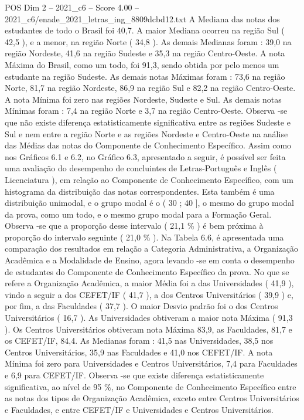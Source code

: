 \begin{textsample}{POS Dim 2 – 2021\_c6 – Score 4.00 – 2021\_c6/enade\_2021\_letras\_ing\_8809dcbd12.txt}
A Mediana das notas dos estudantes de todo o Brasil foi 40,7.
A maior Mediana ocorreu na região Sul ( 42,5 ), e a menor, na região Norte ( 34,8 ).
As demais Medianas foram : 39,0 na região Nordeste, 41,6 na região Sudeste e 35,3 na região Centro-Oeste.
A nota Máxima do Brasil, como um todo, foi 91,3, sendo obtida por pelo menos um estudante na região Sudeste.
As demais notas Máximas foram : 73,6 na região Norte, 81,7 na região Nordeste, 86,9 na região Sul e 82,2 na região Centro-Oeste.
A nota Mínima foi zero nas regiões Nordeste, Sudeste e Sul.
As demais notas Mínimas foram : 7,4 na região Norte e 3,7 na região Centro-Oeste.
Observa -se que não existe diferença estatisticamente significativa entre as regiões Sudeste e Sul e nem entre a região Norte e as regiões Nordeste e Centro-Oeste na análise das Médias das notas do Componente de Conhecimento Específico.
Assim como nos Gráficos 6.1 e 6.2, no Gráfico 6.3, apresentado a seguir, é possível ser feita uma avaliação do desempenho de concluintes de Letras-Português e Inglês ( Licenciatura ), em relação ao Componente de Conhecimento Específico, com um histograma da distribuição das notas correspondentes.
Esta também é uma distribuição unimodal, e o grupo modal é o ( 30 ; 40 ], o mesmo do grupo modal da prova, como um todo, e o mesmo grupo modal para a Formação Geral.
Observa -se que a proporção desse intervalo ( 21,1 \% ) é bem próxima à proporção do intervalo seguinte ( 21,0 \% ).
Na Tabela 6.6, é apresentada uma comparação dos resultados em relação a Categoria Administrativa, a Organização Acadêmica e a Modalidade de Ensino, agora levando -se em conta o desempenho de estudantes do Componente de Conhecimento Específico da prova.
No que se refere a Organização Acadêmica, a maior Média foi a das Universidades ( 41,9 ), vindo a seguir a dos CEFET/IF ( 41,7 ), a dos Centros Universitários ( 39,9 ) e, por fim, a das Faculdades ( 37,7 ).
O maior Desvio padrão foi o dos Centros Universitários ( 16,7 ).
As Universidades obtiveram a maior nota Máxima ( 91,3 ).
Os Centros Universitários obtiveram nota Máxima 83,9, as Faculdades, 81,7 e os CEFET/IF, 84,4.
As Medianas foram : 41,5 nas Universidades, 38,5 nos Centros Universitários, 35,9 nas Faculdades e 41,0 nos CEFET/IF.
A nota Mínima foi zero para Universidades e Centros Universitários, 7,4 para Faculdades e 6,9 para CEFET/IF.
Observa -se que existe diferença estatisticamente significativa, ao nível de 95 \%, no Componente de Conhecimento Específico entre as notas dos tipos de Organização Acadêmica, exceto entre Centros Universitários e Faculdades, e entre CEFET/IF e Universidades e Centros Universitários.

\end{textsample}

